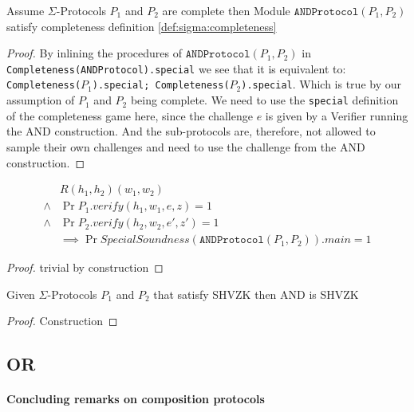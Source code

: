 \begin{lemma}
  Assume $\Sigma$-Protocols $P_{1}$ and $P_{2}$ are complete then
  Module $\texttt{ANDProtocol}(P_1, P_2)$ satisfy completeness definition \ref{def:sigma:completeness}
\end{lemma}
\begin{proof}
  By inlining the procedures of $\texttt{ANDProtocol}(P_{1}, P_{2})$ in
  \texttt{Completeness(ANDProtocol).special} we see that it is equivalent to:
  \texttt{Completeness($P_{1}$).special; Completeness($P_{2}$).special}. Which is true by our
  assumption of $P_{1}$ and $P_{2}$ being complete.
  We need to use the \texttt{special} definition of the completeness game here,
  since the challenge $e$ is given by a Verifier running the AND construction.
  And the sub-protocols are, therefore, not allowed to sample their own
  challenges and need to use the challenge from the AND construction.
\end{proof}


\begin{lemma}
  \begin{align*}
    &R (h_{1}, h_{2}) (w_{1}, w_{2}) \\
    \land &\Pr{P_{1}.verify(h_{1}, w_{1}, e, z)} = 1 \\
    \land &\Pr{P_{2}.verify(h_{2}, w_{2}, e', z')} = 1 \\
    &\implies \Pr{SpecialSoundness(\texttt{ANDProtocol}(P_{1}, P_{2})).main} = 1
  \end{align*}
\end{lemma}
\begin{proof}
  trivial by construction
\end{proof}

\begin{lemma}
  Given $\Sigma$-Protocols $P_{1}$ and $P_{2}$ that satisfy SHVZK then AND is SHVZK
\end{lemma}
\begin{proof}
  Construction
\end{proof}

\subsection{OR}
\label{subsec:sigma_OR}

\paragraph{Concluding remarks on composition protocols}

